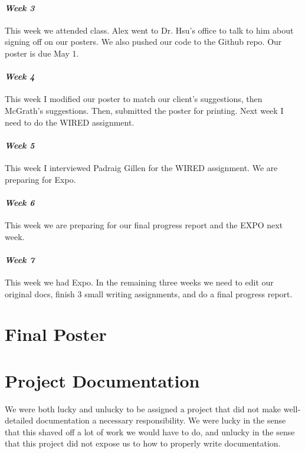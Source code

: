 \documentclass[onecolumn, draftclsnofoot,10pt, compsoc]{IEEEtran}
\begin{document}
\paragraph{\emph{Week 3}}
This week we attended class. Alex went to Dr. Hsu's office to talk to him about signing off on our posters. We also pushed our code to the Github repo. Our poster is due May 1.
\paragraph{\emph{Week 4}}
This week I modified our poster to match our client's suggestions, then McGrath's suggestions. Then, submitted the poster for printing. Next week I need to do the WIRED assignment.
\paragraph{\emph{Week 5}}
This week I interviewed Padraig Gillen for the WIRED assignment. We are preparing for Expo.
\paragraph{\emph{Week 6}}
This week we are preparing for our final progress report and the EXPO next week.
\paragraph{\emph{Week 7}}
This week we had Expo. In the remaining three weeks we need to edit our original docs, finish 3 small writing assignments, and do a final progress report.



\newpage
\section{Final Poster}

\newpage

\section{Project Documentation}
We were both lucky and unlucky to be assigned a project that did not make well-detailed documentation a necessary responsibility. We were lucky in the sense that this shaved off a lot of work we would have to do, and unlucky in the sense that this project did not expose us to how to properly write documentation.
\end{document}
